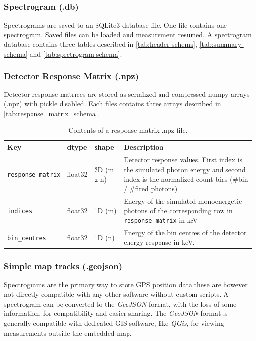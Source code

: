 
\subsubsection{Spectrogram (.db)}\label{sec:file_spectrogram}
Spectrograms are saved to an SQLite3 database file. One file contains one spectrogram. Saved files can be loaded and measurement resumed. A spectrogram database contains three tables described in \autoref{tab:header-schema}, \ref{tab:summary-schema} and \ref{tab:spectrogram-schema}.






\subsubsection{Detector Response Matrix (.npz)}
Detector response matrices are stored as serialized and compressed numpy arrays (.npz) with pickle disabled. Each files contains three arrays described in \autoref{tab:response_matrix_schema}.

\begin{table}[H]
\centering
\caption{Contents of a response matrix .npz file.}
\label{tab:response_matrix_schema}
\begin{tabular}{lllp{8cm}}
\toprule
\textbf{Key}          & \textbf{dtype}   & \textbf{shape}  & \textbf{Description}                                                          \\ \midrule
\texttt{response\_matrix} &
  float32 &
  2D (m x n) &
  Detector response values. First index is the simulated photon energy and second index is the normalized count bins (\#bin / \#fired photons) \\
\texttt{indices}      & float32 & 1D (m) & Energy of the simulated monoenergetic photons of the corresponding row in \texttt{response\_matrix} in keV \\
\texttt{bin\_centres} & float32 & 1D (n) & Energy of the bin centres of the detector energy response in keV.           \\ \bottomrule
\end{tabular}
\end{table}

\subsubsection{Simple map tracks (.geojson)}
Spectrograms are the primary way to store GPS position data these are however not directly compatible with any other software without custom scripts. A spectrogram can be converted to the \textit{GeoJSON} format, with the loss of some information, for compatibility and easier sharing. The \textit{GeoJSON} format is generally compatible with dedicated GIS software, like \textit{QGis}, for viewing measurements outside the embedded map.

